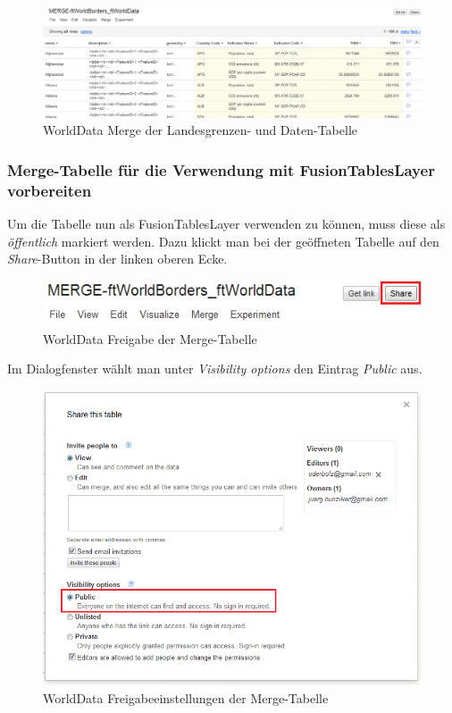 \begin{figure}[htbp]
	\centering
	\includegraphics[scale=0.4]{images/usecase1-worlddata/worlddata-merge_done.png}
	\caption{WorldData Merge der Landesgrenzen- und Daten-Tabelle}
	\label{worlddata-merge_done}
\end{figure}

\subsubsection{Merge-Tabelle für die Verwendung mit FusionTablesLayer vorbereiten}
Um die Tabelle nun als FusionTablesLayer verwenden zu können, muss diese als \emph{öffentlich} markiert werden. Dazu klickt man bei der geöffneten Tabelle auf den \emph{Share}-Button in der linken oberen Ecke.

\begin{figure}[htbp]
	\centering
	\includegraphics{images/usecase1-worlddata/worlddata-prepare_fusiontableslayer1.png}
	\caption{WorldData Freigabe der Merge-Tabelle}
	\label{worlddata-prepare_fusiontableslayer1.png}
\end{figure}

Im Dialogfenster wählt man unter \emph{Visibility options} den Eintrag \emph{Public} aus.

\begin{figure}[htbp]
	\centering
	\includegraphics[scale=0.8]{images/usecase1-worlddata/worlddata-prepare_fusiontableslayer2.png}
	\caption{WorldData Freigabeeinstellungen der Merge-Tabelle}
	\label{worlddata-prepare_fusiontableslayer2.png}
\end{figure}

